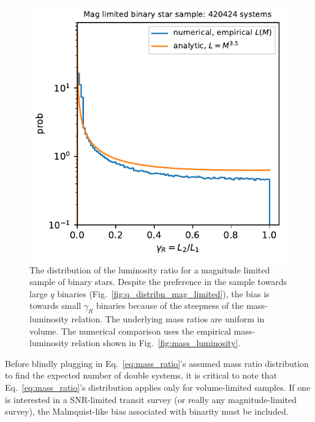\documentclass{emulateapj}
\begin{document}
\begin{figure}[!t]
    \begin{center}
        \includegraphics[width=.5\textwidth]{figures/gammaR_distribn_mag_limited.pdf}
    \end{center}
    \caption{The distribution of the luminosity ratio for a magnitude limited 
        sample of binary stars. Despite the preference in the sample towards 
        large $q$ binaries (Fig.~\protect\ref{fig:q_distribn_mag_limited}), 
        the bias is towards small $\gamma_R$ binaries because of the steepness 
        of the mass-luminosity relation.
        The underlying mass ratios are uniform in volume.
        The numerical comparison uses the empirical mass-luminosity relation 
        shown in Fig.~\ref{fig:mass_luminosity}.       
    }
    \label{fig:gammaR_distribn_mag_limited}
\end{figure}

Before blindly plugging in Eq.~\ref{eq:mass_ratio}'s assumed mass ratio 
distribution to find the expected number of double systems, it is critical to 
note that Eq.~\ref{eq:mass_ratio}'s distribution applies only for 
volume-limited samples.
If one is interested in a SNR-limited transit survey (or really any
magnitude-limited survey), the Malmquist-like bias associated with binarity
must be included.
\end{document}

